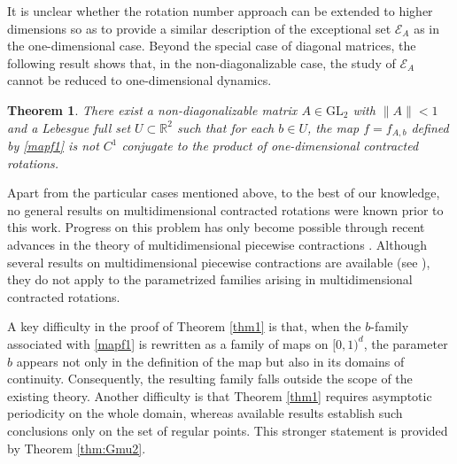 \documentclass[12pt,reqno,a4paper]{amsart}%
\newtheorem{theorem}{Theorem}
\theoremstyle{definition}
\theoremstyle{remark}
\begin{document}
{{It is unclear whether the rotation number approach can be extended to higher dimensions so as to provide a similar description of the exceptional set $\mathcal E_A$ as in the one-dimensional case. Beyond the special case of diagonal matrices, the following result shows that, in the non-diagonalizable case, the study of $\mathcal E_A$ cannot be reduced to one-dimensional dynamics.


\begin{theorem}\label{theoremtwo} There exist a non-diagonalizable matrix $A\in\mathrm{GL}_2$ with $\|A\|<1$ and a Lebesgue full set $U\subset\mathbb{R}^2$ such that for each $b\in U$,  the map $f=f_{A,b}$ defined by \eqref{mapf1} is not $C^1$ conjugate to the  product of one-dimensional contracted rotations. 
\end{theorem}

Apart from the particular cases mentioned above, to the best of our knowledge, no general results on multidimensional contracted rotations were known prior to this work. Progress on this problem has only become possible through recent advances in the theory of multidimensional piecewise contractions \cite{GaivaoPires2024,JAIN_LIVERANI_2025}. Although several results on multidimensional piecewise contractions are available (see \cite{BD08,CGMU16,zbMATH04182365}), they do not apply to the parametrized families arising in multidimensional contracted rotations.

A key difficulty in the proof of Theorem \ref{thm1} is that, when the $b$-family associated with \eqref{mapf1} is rewritten as a family of maps on $[0,1)^d$, the parameter $b$ appears not only in the definition of the map but also in its domains of continuity. Consequently, the resulting family falls outside the scope of the existing theory. Another difficulty is that Theorem \ref{thm1} requires asymptotic periodicity on the whole domain, whereas available results establish such conclusions only on the set of regular points. This stronger statement is provided by Theorem \ref{thm:Gmu2}.


}}
\end{document}
